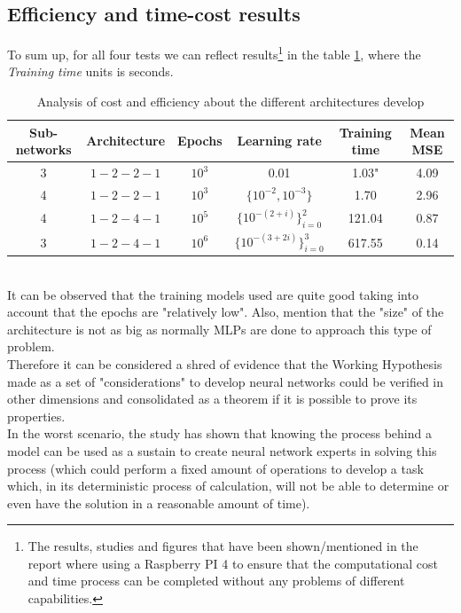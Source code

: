 \documentclass[a4paper, 11pt]{article}
\begin{document}
\newpage
\subsection{Efficiency and time-cost results}
To sum up, for all four tests we can reflect results\footnote{The results, studies and figures that have been shown/mentioned in the report where using a Raspberry PI 4 to ensure that the computational cost and time process can be completed without any problems of different capabilities.} in the table \ref{efficiency-table}, where the \textit{Training time} units is seconds.\\
\begin{table}[h]
    \centering
    \begin{tabular}{c|c|c|c|c|c}
 Sub-networks & Architecture & Epochs & Learning rate & Training time & Mean MSE\\\hline\hline
 3 & $1-2-2-1$ & $10^3$ & 0.01 & 1.03" & 4.09 \\\hline
 4 & $1-2-2-1$ & $10^3$ & $\{10^{-2}, 10^{-3}\}$ & 1.70 & 2.96 \\\hline
 4 & $1-2-4-1$ & $10^5$ & $\{10^{-(2+i)}\}_{i=0}^{2}$& 121.04 & 0.87 \\\hline
 3 & $1-2-4-1$ & $10^6$ & $\{10^{-(3+2i)}\}_{i=0}^{3}$& 617.55 & 0.14\\
    \end{tabular}
    \caption{Analysis of cost and efficiency about the different architectures develop}
    \label{efficiency-table}
\end{table}\\
It can be observed that the training models used are quite good taking into account that the epochs are "relatively low". Also, mention that the "size" of the architecture is not as big as normally MLPs are done to approach this type of problem.\\
Therefore it can be considered a shred of evidence that the Working Hypothesis made as a set of "considerations" to develop neural networks could be verified in other dimensions and consolidated as a theorem if it is possible to prove its properties.\\
In the worst scenario, the study has shown that knowing the process behind a model can be used as a sustain to create neural network experts in solving this process (which could perform a fixed amount of operations to develop a task which, in its deterministic process of calculation, will not be able to determine or even have the solution in a reasonable amount of time).
\end{document}
